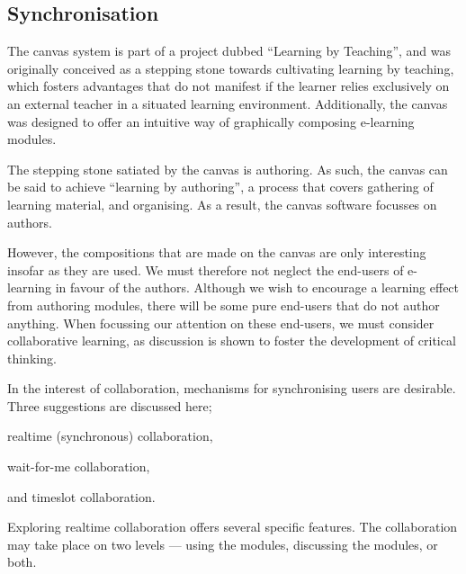\subsection{Synchronisation}
\label{synchronisation}
The canvas system is part of a project dubbed ``Learning by Teaching'', and 
was originally conceived as a stepping stone towards cultivating learning by 
teaching, which fosters advantages that do not manifest if the learner relies 
exclusively on an external teacher in a situated learning 
environment\cite{cortese2005learning}. Additionally, the canvas was designed 
to offer an intuitive way of graphically composing e-learning 
modules\cite{berntsen2015enabling}.

The stepping stone satiated by the canvas is authoring. As such, the canvas 
can be said to achieve ``learning by authoring'', a process that covers 
gathering of learning material, and organising. As a result, the canvas 
software focusses on authors.

However, the compositions that are made on the canvas are only interesting 
insofar as they are used. We must therefore not neglect the end-users of 
e-learning in favour of the authors. Although we wish to encourage a learning 
effect from authoring modules, there will be some pure end-users that do not 
author anything. When focussing our attention on these end-users, we must 
consider collaborative learning, as discussion is shown to foster the 
development of critical thinking\cite{gokhale1995collaborative}.

In the interest of collaboration, mechanisms for synchronising users are 
desirable. Three suggestions are discussed here;
\begin{itemize*}
  \item realtime (synchronous) collaboration,
  \item wait-for-me collaboration,
  \item and timeslot collaboration.
\end{itemize*}

Exploring realtime collaboration offers several specific features. The 
collaboration may take place on two levels --- using the modules, discussing 
the modules, or both.

